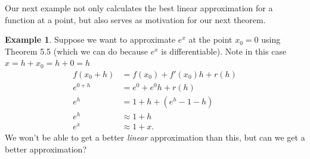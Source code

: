 \documentclass{article}
\theoremstyle{definition}
\newtheorem{example}{Example}[section]
\begin{document}
	Our next example not only calculates the best linear approximation for a function at a point, but also serves as motivation for our next theorem. 
	\begin{example}
		Suppose we want to approximate $ e^x $ at the point $ x_0=0 $ using Theorem 5.5 (which we can do because $ e^x $ is differentiable). Note in this case $ x=h+x_0=h+0=h $
		\begin{align*}
			f(x_0+h)&=f(x_0)+f'(x_0)h+r(h)\\
			e^{0+h}&=e^0+e^0h+r(h)\\
			e^h&=1+h+(e^h-1-h)\\
			e^h&\approx 1+h\\
			e^x&\approx 1+x.
		\end{align*}
		We won't be able to get a better \textit{linear} approximation than this, but can we get a better approximation? 
		

\end{example}
\end{document}
